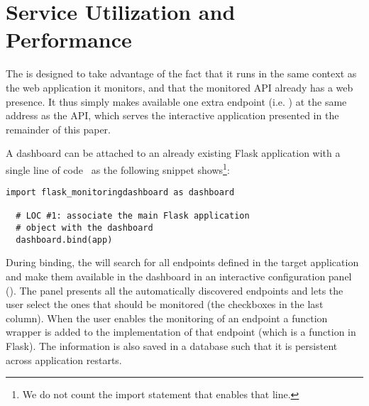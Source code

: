 

  \section{Service Utilization and Performance}
  \label{sec:utilandperf}


  The \tool is designed to take advantage of the fact that it runs in the same context as the web application it monitors, and that the monitored API already has a web presence. It thus simply makes available one extra endpoint (i.e. ) at the same address as the API, which serves the interactive application presented in the remainder of this paper. 

  A dashboard can be attached to an already existing Flask application with a single line of code~\cite{vogel2017low} as the following snippet shows\footnote{We do not count the import statement that enables that line.}:


  \begin{lstlisting}[style=custompython]
  import flask_monitoringdashboard as dashboard

  # LOC #1: associate the main Flask application 
  # object with the dashboard
  dashboard.bind(app) 

  \end{lstlisting}

  During binding, the \tool will search for all endpoints defined in the target application and make them available in the dashboard in an interactive configuration panel (). The panel presents all the automatically discovered endpoints and lets the user select the ones that should be monitored (the checkboxes in the last column). When the user enables the monitoring of an endpoint a function wrapper is added to the implementation of that endpoint (which is a function in Flask). The information is also saved in a database such that it is persistent across application restarts. 




